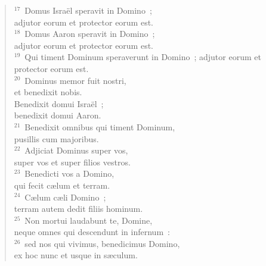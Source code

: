 \begin{verse}
${}^{17}$~Domus Isra\"el speravit in Domino~;\\ adjutor eorum et protector eorum est.\\
${}^{18}$~Domus Aaron speravit in Domino~;\\ adjutor eorum et protector eorum est.\\
${}^{19}$~Qui timent Dominum speraverunt in Domino~; adjutor eorum et protector eorum est.\\
${}^{20}$~Dominus memor fuit nostri,\\ et benedixit nobis.\\ Benedixit domui Isra\"el~;\\ benedixit domui Aaron.\\
${}^{21}$~Benedixit omnibus qui timent Dominum,\\ pusillis cum majoribus.\\
${}^{22}$~Adjiciat Dominus super vos,\\ super vos et super filios vestros.\\
${}^{23}$~Benedicti vos a Domino,\\ qui fecit c\ae lum et terram.\\
${}^{24}$~C\ae lum c\ae li Domino~;\\ terram autem dedit filiis hominum.\\
${}^{25}$~Non mortui laudabunt te, Domine,\\ neque omnes qui descendunt in infernum~:\\
${}^{26}$~sed nos qui vivimus, benedicimus Domino,\\ ex hoc nunc et usque in s\ae culum.\end{verse}



